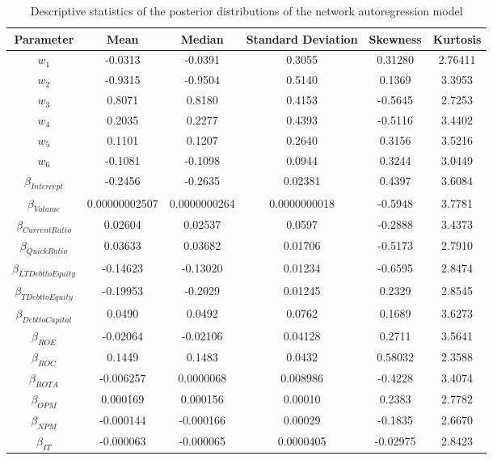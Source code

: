 \documentclass[times, doublespace]{auth}
\begin{document}
\begin{table}
	\small
	\centering
	\caption{Descriptive statistics of the posterior distributions of the network autoregression model}
	\label{table4a}
	\begin{tabular}{|c|c|c|c|c|c|}
		\hline
		Parameter & Mean & Median & Standard Deviation & Skewness & Kurtosis\\
		\hline
		$w_{1}$ & -0.0313 & -0.0391 & 0.3055 & 0.31280 & 2.76411\\
		\hline
		$w_{2}$ & -0.9315 & -0.9504 & 0.5140 & 0.1369 & 3.3953\\
		\hline
		$w_{3}$ & 0.8071 & 0.8180 & 0.4153 & -0.5645 & 2.7253\\
		\hline
		$w_{4}$ & 0.2035 & 0.2277 & 0.4393 & -0.5116 & 3.4402\\
		\hline
		$w_{5}$ & 0.1101 & 0.1207 & 0.2640 & 0.3156 & 3.5216\\
		\hline
		$w_{6}$ & -0.1081 & -0.1098 & 0.0944 & 0.3244 & 3.0449\\
		\hline
		$\beta_{Intercept}$ & -0.2456 & -0.2635 & 0.02381 & 0.4397 & 3.6084\\
		\hline
		$\beta_{Volume}$ & 0.00000002507 & 0.0000000264 & 0.0000000018 & -0.5948 & 3.7781\\
		\hline
		$\beta_{Current Ratio}$ & 0.02604 & 0.02537 & 0.0597 & -0.2888 & 3.4373\\
		\hline
		$\beta_{Quick Ratio}$ & 0.03633 & 0.03682 & 0.01706 & -0.5173 & 2.7910\\
		\hline
		$\beta_{LTDebt to Equity}$ & -0.14623 & -0.13020 & 0.01234 & -0.6595 & 2.8474\\
		\hline
		$\beta_{TDebt to Equity}$ & -0.19953 & -0.2029 & 0.01245 & 0.2329 & 2.8545\\
		\hline
		$\beta_{Debt to Capital}$ & 0.0490 & 0.0492 & 0.0762 & 0.1689 & 3.6273\\
		\hline
		$\beta_{ROE}$ & -0.02064 & -0.02106 & 0.04128 & 0.2711 & 3.5641\\
		\hline
		$\beta_{ROC}$ & 0.1449 & 0.1483 & 0.0432 & 0.58032 & 2.3588\\
		\hline
		$\beta_{ROTA}$ & -0.006257 & 0.0000068 & 0.008986 & -0.4228 & 3.4074\\
		\hline
		$\beta_{OPM}$ & 0.000169 & 0.000156 & 0.00010 & 0.2383 & 2.7782\\
		\hline
		$\beta_{NPM}$ & -0.000144 & -0.000166 & 0.00029 & -0.1835 & 2.6670\\
		\hline
		$\beta_{IT}$ & -0.000063 & -0.000065 & 0.0000405 & -0.02975 & 2.8423\\

\end{tabular}
\end{table}
\end{document}
